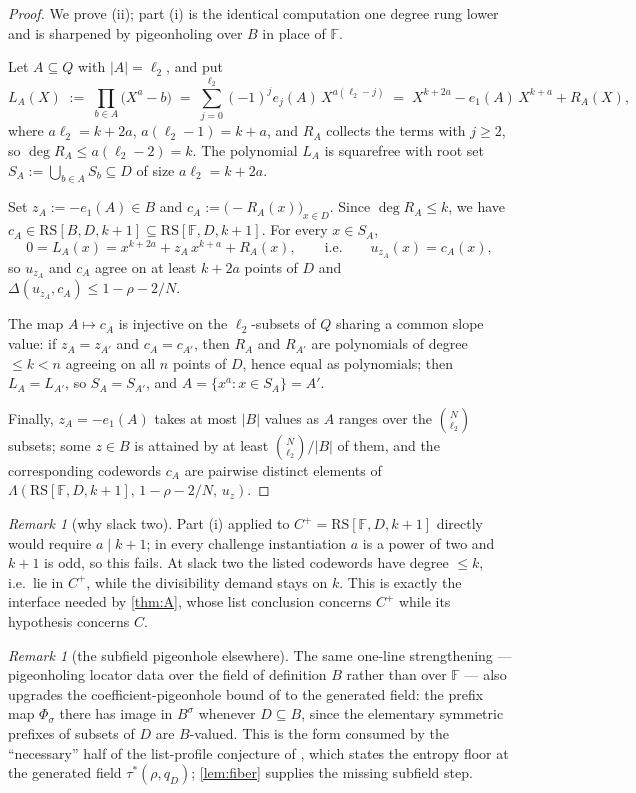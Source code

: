 \documentclass[11pt]{article}
\theoremstyle{definition}
\theoremstyle{remark}
\newtheorem{remark}[theorem]{Remark}
\newcommand{\F}{\mathbb{F}}
\newcommand{\B}{B}
\newcommand{\RS}{\mathrm{RS}}
\newcommand{\dist}{\Delta}
\newcommand{\Lst}{\Lambda}
\begin{document}
\begin{proof}
We prove (ii); part (i) is the identical computation one degree rung lower and is \cite[Main Thm.\,(d)]{Cho26a} sharpened by pigeonholing over $\B$ in place of $\F$.

Let $A\subseteq Q$ with $|A|=\ell_2$, and put
\[
L_A(X)\;:=\;\prod_{b\in A}\bigl(X^a-b\bigr)\;=\;\sum_{j=0}^{\ell_2}(-1)^j e_j(A)\,X^{a(\ell_2-j)}\;=\;X^{k+2a}-e_1(A)\,X^{k+a}+R_A(X),
\]
where $a\ell_2=k+2a$, $a(\ell_2-1)=k+a$, and $R_A$ collects the terms with $j\ge2$, so $\deg R_A\le a(\ell_2-2)=k$. The polynomial $L_A$ is squarefree with root set $S_A:=\bigcup_{b\in A}S_b\subseteq D$ of size $a\ell_2=k+2a$.

Set $z_A:=-e_1(A)\in\B$ and $c_A:=\bigl(-R_A(x)\bigr)_{x\in D}$. Since $\deg R_A\le k$, we have $c_A\in\RS[\B,D,k+1]\subseteq\RS[\F,D,k+1]$. For every $x\in S_A$,
\[
0=L_A(x)=x^{k+2a}+z_A\,x^{k+a}+R_A(x),\qquad\text{i.e.}\qquad u_{z_A}(x)=c_A(x),
\]
so $u_{z_A}$ and $c_A$ agree on at least $k+2a$ points of $D$ and $\dist(u_{z_A},c_A)\le1-\rho-2/N$.

The map $A\mapsto c_A$ is injective on the $\ell_2$-subsets of $Q$ sharing a common slope value: if $z_A=z_{A'}$ and $c_A=c_{A'}$, then $R_A$ and $R_{A'}$ are polynomials of degree $\le k<n$ agreeing on all $n$ points of $D$, hence equal as polynomials; then $L_A=L_{A'}$, so $S_A=S_{A'}$, and $A=\{x^a:x\in S_A\}=A'$.

Finally, $z_A=-e_1(A)$ takes at most $|\B|$ values as $A$ ranges over the $\binom{N}{\ell_2}$ subsets; some $z\in\B$ is attained by at least $\binom{N}{\ell_2}/|\B|$ of them, and the corresponding codewords $c_A$ are pairwise distinct elements of $\Lst(\RS[\F,D,k+1],\,1-\rho-2/N,\,u_z)$.
\end{proof}

\begin{remark}[why slack two]\label{rem:slacktwo}
Part (i) applied to $C^+=\RS[\F,D,k+1]$ directly would require $a\mid k+1$; in every challenge instantiation $a$ is a power of two and $k+1$ is odd, so this fails. At slack two the listed codewords have degree $\le k$, i.e.\ lie in $C^+$, while the divisibility demand stays on $k$. This is exactly the interface needed by \cref{thm:A}, whose list conclusion concerns $C^+$ while its hypothesis concerns $C$.
\end{remark}

\begin{remark}[the subfield pigeonhole elsewhere]\label{rem:subpigeon}
The same one-line strengthening --- pigeonholing locator data over the field of definition $\B$ rather than over $\F$ --- also upgrades the coefficient-pigeonhole bound of \cite{Cho26b} to the generated field: the prefix map $\Phi_\sigma$ there has image in $\B^\sigma$ whenever $D\subseteq\B$, since the elementary symmetric prefixes of subsets of $D$ are $\B$-valued. This is the form consumed by the ``necessary'' half of the list-profile conjecture of \cite{Cho26b}, which states the entropy floor at the generated field $\tau^{*}(\rho,q_D)$; \cref{lem:fiber} supplies the missing subfield step.
\end{remark}
\end{document}
